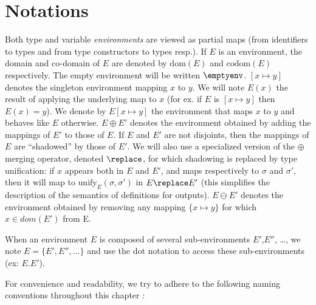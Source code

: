 \section{Notations}
\label{sec:typing-notations}

Both type and variable \emph{environments} are viewed as partial maps (from identifiers to types and
from type constructors to types resp.). If $E$ is an environment, the domain and co-domain of $E$
are denoted by $\text{dom}(E)$ and $\text{codom}(E)$ respectively.  The empty environment will be
written $\emptyenv$.  $[x \mapsto y]$ denotes the singleton environment mapping $x$ to $y$.  We will
note $E(x)$ the result of applying the underlying map to $x$ (for ex. if $E$ is $[x \mapsto y]$ then
$E(x)=y$). We denote by $E[x \mapsto y]$ the environment that maps $x$ to $y$ and behaves like $E$
otherwise. $E \oplus E'$ denotes the environment obtained by adding the mappings of $E'$ to those of
$E$. If $E$ and $E'$ are not disjoints, then the mappings of $E$ are ``shadowed'' by those of
$E'$. We will also use a specialized version of the $\oplus$ merging
operator, denoted $\replace$, for which shadowing is replaced by type unification: if $x$ appears
both in $E$ and $E'$, and maps respectively to $\sigma$ and $\sigma'$, then it will map to
$\text{unify}_E(\sigma,\sigma')$ in $E \replace E'$
(this simplifies the description of the semantics of definitions for outputs).
$E \ominus E'$ denotes the environment obtained by removing any mapping $\lbrace x \mapsto y \rbrace$ for which $x
\in dom(E')$ from E.

When an environment $E$ is composed of several sub-environments $E'$,$E''$, \ldots, we note $E = \{
E', E'', \ldots \}$ and use the dot notation to access these sub-environments (ex: $E.E'$).

\medskip
For convenience and readability, we try to adhere to the following
naming conventions throughout this chapter :


